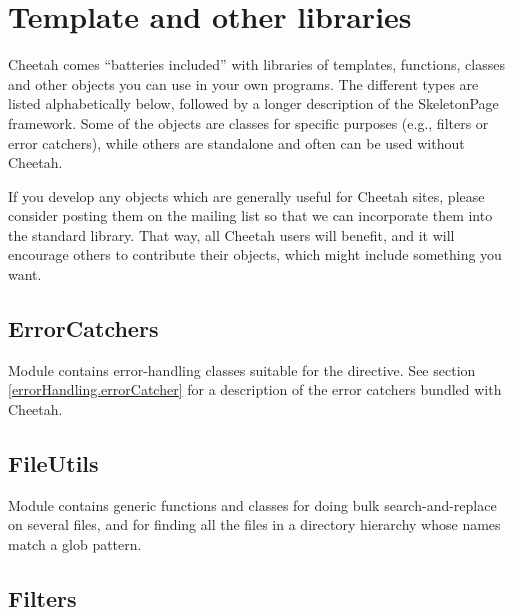 \section{Template and other libraries}
\label{libraries}

Cheetah comes ``batteries included'' with libraries of templates, functions,
classes and other objects you can use in your own programs.  The different
types are listed alphabetically below, followed by a longer description of
the SkeletonPage framework.  Some of the objects are classes for specific
purposes (e.g., filters or error catchers), while others are standalone and
often can be used without Cheetah.

If you develop any objects which are generally useful for Cheetah sites,
please consider posting them on the mailing list so that we can incorporate
them into the standard library.  That way, all Cheetah users will benefit, and
it will encourage others to contribute their objects, which might include
something you want.


\subsection{ErrorCatchers}
\label{libraries.ErrorCatchers}

Module  contains error-handling classes
suitable for the  directive.
See section \ref{errorHandling.errorCatcher} for a description of the 
error catchers bundled with Cheetah.


\subsection{FileUtils}
\label{libraries.FileUtils}

Module  contains generic functions and classes for 
doing bulk search-and-replace on several files, and for finding all the files
in a directory hierarchy whose names match a glob pattern.

\subsection{Filters}
\label{libraries.Filters}

